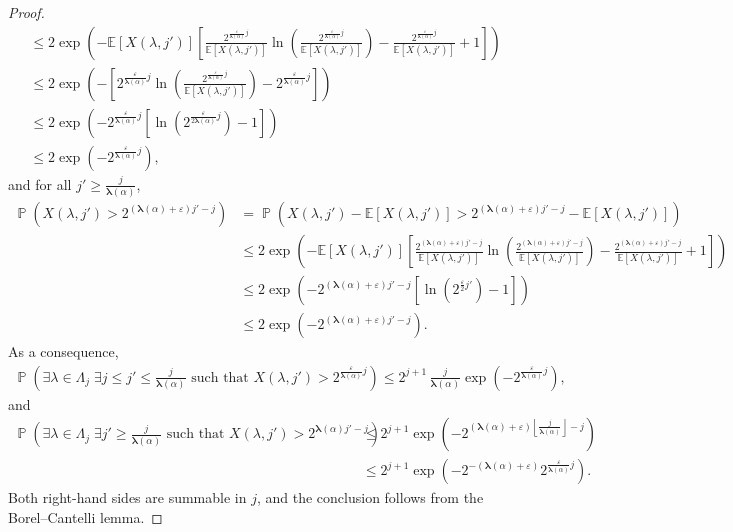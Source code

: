 \documentclass[a4paper,11pt,oneside]{article}
\DeclareMathOperator{\prob}{\mathbb{P}}
\theoremstyle{definition}
\theoremstyle{plain}
\begin{document}
\begin{proof}
\begin{align*}
        & \leq 2\exp\left(-\mathbb{E}[X(\lambda,j')]\left[\frac{2^{\frac{\varepsilon}{\bm{\lambda}(\alpha)}j}}{\mathbb{E}[X(\lambda,j')]}\ln\left(\frac{2^{\frac{\varepsilon}{\bm{\lambda}(\alpha)}j}}{\mathbb{E}[X(\lambda,j')]}\right)-\frac{2^{\frac{\varepsilon}{\bm{\lambda}(\alpha)}j}}{\mathbb{E}[X(\lambda,j')]}+1\right]\right) \\
        & \leq 2\exp\left(-\left[2^{\frac{\varepsilon}{\bm{\lambda}(\alpha)}j}\ln\left(\frac{2^{\frac{\varepsilon}{\bm{\lambda}(\alpha)}j}}{\mathbb{E}[X(\lambda,j')]}\right)-2^{\frac{\varepsilon}{\bm{\lambda}(\alpha)}j}
        \right]\right) \\
        & \leq 2\exp\left(-2^{\frac{\varepsilon}{\bm{\lambda}(\alpha)}j}\left[\ln\left(2^{\frac{\varepsilon}{2\bm{\lambda}(\alpha)}j}\right)-1
        \right]\right) \\
        & \leq 2\exp\left(-2^{\frac{\varepsilon}{\bm{\lambda}(\alpha)}j}\right),
    \end{align*}
    and for all $j'\geq\frac{j}{\bm{\lambda}(\alpha)}$,
    \begin{align*}
        \prob\left(X(\lambda,j')>2^{(\bm{\lambda}(\alpha)+\varepsilon)j'-j}\right)
        & = \prob\left(X(\lambda,j')-\mathbb{E}[X(\lambda,j')]>2^{(\bm{\lambda}(\alpha)+\varepsilon)j'-j}-\mathbb{E}[X(\lambda,j')]\right) \\
        & \leq 2\exp\left(-\mathbb{E}[X(\lambda,j')]\left[\frac{2^{(\bm{\lambda}(\alpha)+\varepsilon)j'-j}}{\mathbb{E}[X(\lambda,j')]}\ln\left(\frac{2^{(\bm{\lambda}(\alpha)+\varepsilon)j'-j}}{\mathbb{E}[X(\lambda,j')]}\right)-\frac{2^{(\bm{\lambda}(\alpha)+\varepsilon)j'-j}}{\mathbb{E}[X(\lambda,j')]}+1\right]\right) \\
        & \leq 2\exp\left(-2^{(\bm{\lambda}(\alpha)+\varepsilon)j'-j}\left[\ln\left(2^{\frac{\varepsilon}{2}j'}\right)-1
        \right]\right) \\
        & \leq 2\exp\left(-2^{(\bm{\lambda}(\alpha)+\varepsilon)j'-j}\right).
    \end{align*}
    As a consequence,
    \begin{align*}
        \prob\left(\exists\lambda\in\Lambda_j\;\exists j \le j'\leq \frac{j}{\bm{\lambda}(\alpha)}\text{ such that } X(\lambda,j')>2^{\frac{\varepsilon}{\bm{\lambda}(\alpha)}j}\right) \leq  2^{j+1}\,\frac{j}{\bm{\lambda}(\alpha)}\exp\left(-2^{\frac{\varepsilon}{\bm{\lambda}(\alpha)}j}\right),
    \end{align*}
    and
    \begin{align*}
        \prob\left(\exists\lambda\in\Lambda_j\;\exists j'\geq \frac{j}{\bm{\lambda}(\alpha)}\text{ such that } X(\lambda,j')>2^{\bm{\lambda}(\alpha)j'-j}\right) 
        & \leq 2^{j+1}\exp\left(-2^{(\bm{\lambda}(\alpha)+\varepsilon)\left\lfloor\frac{j}{\bm{\lambda}(\alpha)}\right\rfloor-j}\right) \\
        & \leq 2^{j+1}\exp\left(-2^{-(\bm{\lambda}(\alpha)+\varepsilon)}2^{\frac{\varepsilon}{\bm{\lambda}(\alpha)}j}\right).
    \end{align*}
Both right-hand sides are summable in $j$, and the conclusion follows
from the Borel--Cantelli lemma.
\end{proof}
\end{document}
